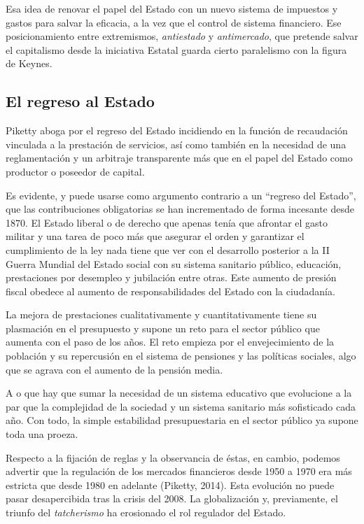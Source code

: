 \documentclass[
]{article}
\begin{document}
Esa idea de renovar el papel del Estado con un nuevo sistema de
impuestos y gastos para salvar la eficacia, a la vez que el control de
sistema financiero. Ese posicionamiento entre extremismos,
\emph{antiestado} y \emph{antimercado}, que pretende salvar el
capitalismo desde la iniciativa Estatal guarda cierto paralelismo con la
figura de Keynes.

\hypertarget{el-regreso-al-estado}{%
\subsection{El regreso al Estado}\label{el-regreso-al-estado}}

Piketty aboga por el regreso del Estado incidiendo en la función de
recaudación vinculada a la prestación de servicios, así como también en
la necesidad de una reglamentación y un arbitraje transparente más que
en el papel del Estado como productor o poseedor de capital.

Es evidente, y puede usarse como argumento contrario a un ``regreso del
Estado'', que las contribuciones obligatorias se han incrementado de
forma incesante desde 1870. El Estado liberal o de derecho que apenas
tenía que afrontar el gasto militar y una tarea de poco más que asegurar
el orden y garantizar el cumplimiento de la ley nada tiene que ver con
el desarrollo posterior a la II Guerra Mundial del Estado social con su
sistema sanitario público, educación, prestaciones por desempleo y
jubilación entre otras. Este aumento de presión fiscal obedece al
aumento de responsabilidades del Estado con la ciudadanía.

La mejora de prestaciones cualitativamente y cuantitativamente tiene su
plasmación en el presupuesto y supone un reto para el sector público que
aumenta con el paso de los años. El reto empieza por el envejecimiento
de la población y su repercusión en el sistema de pensiones y las
políticas sociales, algo que se agrava con el aumento de la pensión
media.

A o que hay que sumar la necesidad de un sistema educativo que
evolucione a la par que la complejidad de la sociedad y un sistema
sanitario más sofisticado cada año. Con todo, la simple estabilidad
presupuestaria en el sector público ya supone toda una proeza.

Respecto a la fijación de reglas y la observancia de éstas, en cambio,
podemos advertir que la regulación de los mercados financieros desde
1950 a 1970 era más estricta que desde 1980 en adelante (Piketty, 2014).
Esta evolución no puede pasar desapercibida tras la crisis del 2008. La
globalización y, previamente, el triunfo del \emph{tatcherismo} ha
erosionado el rol regulador del Estado.
\end{document}
